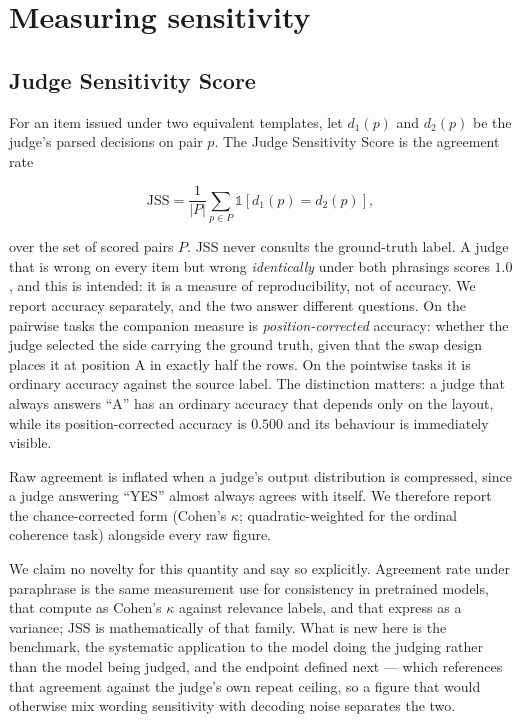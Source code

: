 \section{Measuring sensitivity}
\label{sec:metrics}

\subsection{Judge Sensitivity Score}

For an item issued under two equivalent templates, let $d_1(p)$ and $d_2(p)$ be
the judge's parsed decisions on pair $p$. The Judge Sensitivity Score is the
agreement rate

\[
  \mathrm{JSS} = \frac{1}{|P|}\sum_{p \in P} \mathbb{1}[d_1(p) = d_2(p)],
\]

over the set of scored pairs $P$. JSS never consults the ground-truth label. A
judge that is wrong on every item but wrong \emph{identically} under both
phrasings scores $1.0$, and this is intended: it is a measure of reproducibility,
not of accuracy. We report accuracy separately, and the two answer different
questions. On the pairwise tasks the companion measure is \emph{position-corrected}
accuracy: whether the judge selected the side carrying the ground truth, given
that the swap design places it at position A in exactly half the rows. On the
pointwise tasks it is ordinary accuracy against the source label. The
distinction matters: a judge that always answers ``A'' has an ordinary accuracy
that depends only on the layout, while its position-corrected accuracy is
$0.500$ and its behaviour is immediately visible.

Raw agreement is inflated when a judge's output distribution is compressed, since
a judge answering ``YES'' almost always agrees with itself. We therefore report
the chance-corrected form (Cohen's $\kappa$; quadratic-weighted for the
ordinal coherence task) alongside every raw figure.

We claim no novelty for this quantity and say so explicitly. Agreement rate under
paraphrase is the same measurement \citet{elazar2021measuring} use for consistency
in pretrained models, that \citet{arabzadeh2025human} compute as Cohen's $\kappa$
against relevance labels, and that \citet{zhuo2024prosa} express as a variance;
JSS is mathematically of that family. What is new here is the benchmark, the
systematic application to the model doing the judging rather than the model being
judged, and the endpoint defined next --- which references that agreement against
the judge's own repeat ceiling, so a figure that would otherwise mix wording
sensitivity with decoding noise separates the two.

